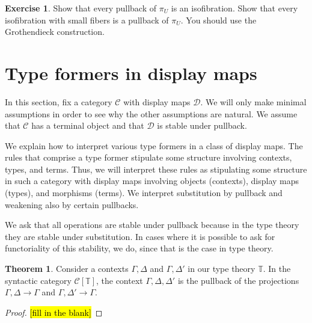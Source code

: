 \documentclass{article}
\theoremstyle{definition}
\newtheorem{theorem}[definition]{Theorem}
\newtheorem{exercise}[definition]{Exercise}
\newcommand{\T}{\mathbb T}
\newcommand{\C}{\mathcal C}
\newcommand{\D}{\mathcal D}
\newcommand{\syncat}[1]{\C [#1]}
\begin{document}
\begin{exercise}
    Show that every pullback of $\pi_U$ is an isofibration. Show that every isofibration with small fibers is a pullback of $\pi_U$. You should use the Grothendieck construction.
\end{exercise}

\section{Type formers in display maps}

In this section, fix a category $\C$ with display maps $\D$. We will only make minimal assumptions in order to see why the other assumptions are natural. We assume that $\C$ has a terminal object and that $\D$ is stable under pullback.

We explain how to interpret various type formers in a class of display maps. The rules that comprise a type former stipulate some structure involving contexts, types, and terms. Thus, we will interpret these rules as stipulating some structure in such a category with display maps involving objects (contexts), display maps (types), and morphisms (terms). We interpret substitution by pullback and weakening also by certain pullbacks.

We ask that all operations are stable under pullback because in the type theory they are stable under substitution. In cases where it is possible to ask for functoriality of this stability, we do, since that is the case in type theory.

\begin{theorem}
    Consider a contexts $\Gamma, \Delta$ and $\Gamma, \Delta'$ in our type theory $\T$.
    In the syntactic category $\syncat{\T}$, the context $\Gamma, \Delta, \Delta'$ is the pullback of the projections $\Gamma, \Delta \to \Gamma$ and $\Gamma, \Delta' \to \Gamma$.
\end{theorem}

\begin{proof}
    \hl{[fill in the blank]}
\end{proof}


\end{document}
